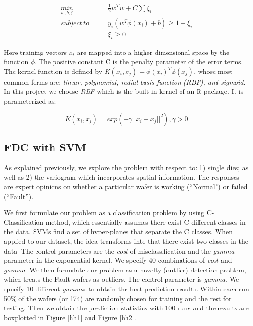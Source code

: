 \documentclass[english]{article}
\numberwithin{equation}{section}
\numberwithin{table}{section}
\numberwithin{figure}{section}
\begin{document}
\begin{equation} \label{hheq1}
\begin{split}
\underset{w,b,\xi}{min} \qquad &\frac{1}{2}w^{T}w+C\sum\xi_{i} \\
subject\, to \qquad &y_{i}(w^{T}\phi(x_{i})+b)\geqslant1-\xi_{i} \\
&\xi_{i}\geqslant0
\end{split}
\end{equation}


Here training vectors $x_{i}$ are mapped into a higher dimensional
space by the function $\phi$. The positive constant C is the penalty
parameter of the error terms. The kernel function is defined by $K(x_{i},x_{j})=\phi(x_{i})^{T}\phi(x_{j})$,
whose most common forms are: \emph{linear, polynomial, radial basis
function (RBF), and sigmoid}. In this project we choose \emph{RBF}
which is the built-in kernel of an R package. It is parameterized
as:

\begin{equation} \label{hheq2}
K(x_{i},x_{j})=exp(-\gamma||x_{i}-x_{j}||^{2}),\gamma>0
\end{equation}


\subsection{FDC with SVM}
\hspace{12 pt}
As explained previously, we explore the problem with respect to: 1)
single dies; as well as 2) the variogram which incorporates spatial
information. The responses are expert opinions on whether a particular
wafer is working (``Normal'') or failed (``Fault'').

We first formulate our problem as a classification problem by using
C-Classification method, which essentially assumes there exist C different
classes in the data. SVMs find a set of hyper-planes that separate
the C classes. When applied to our dataset, the idea transforms into
that there exist two classes in the data. The control parameters are
the \emph{cost} of misclassification and the \emph{gamma} parameter
in the exponential kernel. We specify 40 combinations of \emph{cost}
and \emph{gamma}. We then formulate our problem as a novelty (outlier)
detection problem, which treats the Fault wafers as outliers. The
control parameter is \emph{gamma}. We specify 10 different \emph{gamma}s
to obtain the best prediction results. Within each run 50\% of the
wafers (or 174) are randomly chosen for training and the rest for
testing. Then we obtain the prediction statistics with 100 runs and
the results are boxplotted in Figure \ref{hh1} and Figure \ref{hh2}.
\end{document}
